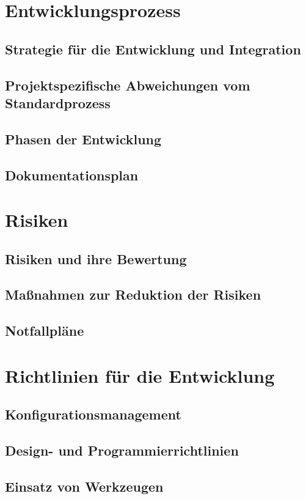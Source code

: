 \documentclass[a4paper,10pt]{scrartcl}
\begin{document}
\section{Entwicklungsprozess}
\subsection{Strategie für die Entwicklung und Integration}
\subsection{Projektspezifische Abweichungen vom Standardprozess}
\subsection{Phasen der Entwicklung}
\subsection{Dokumentationsplan}


\section{Risiken}
\subsection{Risiken und ihre Bewertung}
\subsection{Maßnahmen zur Reduktion der Risiken}
\subsection{Notfallpläne}


\section{Richtlinien für die Entwicklung}
\subsection{Konfigurationsmanagement}
\subsection{Design- und Programmierrichtlinien}
\subsection{Einsatz von Werkzeugen}
\end{document}
